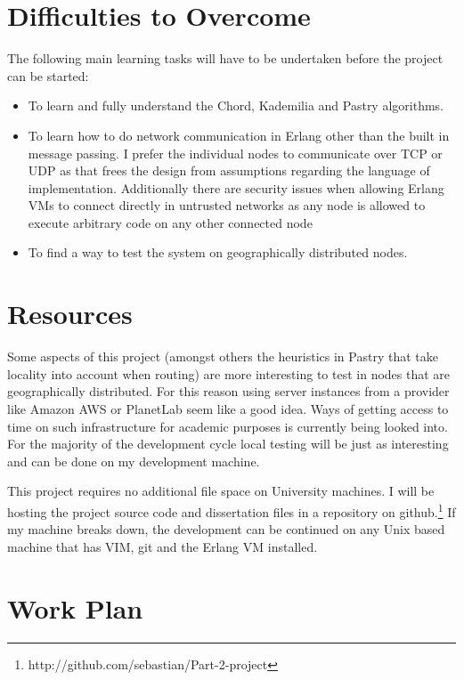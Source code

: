 \section*{Difficulties to Overcome}

The following main learning tasks will have to be undertaken before
the project can be started:

\begin{itemize}

\item To learn and fully understand the Chord, Kademilia and Pastry algorithms.

\item To learn how to do network communication in Erlang other than the built in message passing. I prefer the individual nodes to communicate over TCP or UDP as that frees the design from assumptions regarding the language of implementation. Additionally there are security issues when allowing Erlang VMs to connect directly in untrusted networks as any node is allowed to execute arbitrary code on any other connected node

\item To find a way to test the system on geographically distributed nodes.

\end{itemize}


\section*{Resources}

Some aspects of this project (amongst others the heuristics in Pastry that take locality into account when routing) are more interesting to test in nodes that are geographically distributed. For this reason using server instances from a provider like Amazon AWS or PlanetLab seem like a good idea. Ways of getting access to time on such infrastructure for academic purposes is currently being looked into. For the majority of the development cycle local testing will be just as interesting and can be done on my development machine.

This project requires no additional file space on University machines. I will be hosting the project source code and dissertation files in a repository on github.\footnote{http://github.com/sebastian/Part-2-project}
If my machine breaks down, the development can be continued on any Unix based machine that has VIM, git and the Erlang VM installed.

\section*{Work Plan}

